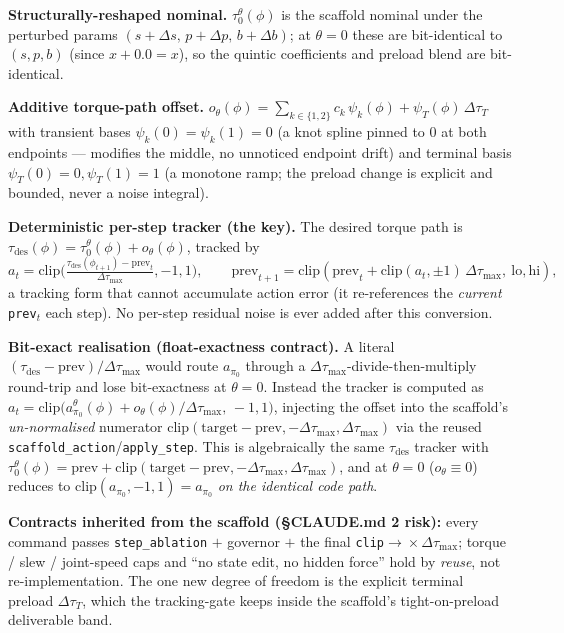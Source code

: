 \documentclass[11pt]{article}
\newcommand{\code}[1]{\texttt{\small #1}}
\newcommand{\slew}{\ensuremath{\Delta\tau_{\max}}}
\begin{document}
\textbf{Structurally-reshaped nominal.} $\tau_0^\theta(\phi)$ is the scaffold nominal under the perturbed params
$(s{+}\Delta s,\,p{+}\Delta p,\,b{+}\Delta b)$; at $\theta{=}0$ these are bit-identical to $(s,p,b)$ (since $x+0.0=x$), so the
quintic coefficients and preload blend are bit-identical.

\textbf{Additive torque-path offset.} $o_\theta(\phi)=\sum_{k\in\{1,2\}} c_k\,\psi_k(\phi)+\psi_T(\phi)\,\Delta\tau_T$ with
transient bases $\psi_k(0){=}\psi_k(1){=}0$ (a knot spline pinned to $0$ at both endpoints --- modifies the middle, no
unnoticed endpoint drift) and terminal basis $\psi_T(0){=}0,\psi_T(1){=}1$ (a monotone ramp; the preload change is explicit
and bounded, never a noise integral).

\textbf{Deterministic per-step tracker (the key).} The desired torque path is
$\tau_{\mathrm{des}}(\phi)=\tau_0^\theta(\phi)+o_\theta(\phi)$, tracked by
\[
a_t=\mathrm{clip}\!\Big(\tfrac{\tau_{\mathrm{des}}(\phi_{t+1})-\text{prev}_t}{\slew},-1,1\Big),\qquad
\text{prev}_{t+1}=\mathrm{clip}(\text{prev}_t+\mathrm{clip}(a_t,\pm1)\,\slew,\ \text{lo},\text{hi}),
\]
a tracking form that cannot accumulate action error (it re-references the \emph{current} \code{prev}$_t$ each step). No
per-step residual noise is ever added after this conversion.

\textbf{Bit-exact realisation (float-exactness contract).} A literal $(\tau_{\mathrm{des}}-\text{prev})/\slew$ would route
$a_{\pi_0}$ through a $\slew$-divide-then-multiply round-trip and lose bit-exactness at $\theta{=}0$. Instead the tracker is
computed as
$a_t=\mathrm{clip}\big(a_{\pi_0}^\theta(\phi)+o_\theta(\phi)/\slew,\,-1,1\big)$, injecting the offset into the scaffold's
\emph{un-normalised} numerator $\mathrm{clip}(\text{target}-\text{prev},-\slew,\slew)$ via the reused
\code{scaffold\_action}/\code{apply\_step}. This is algebraically the same $\tau_{\mathrm{des}}$ tracker with
$\tau_0^\theta(\phi)=\text{prev}+\mathrm{clip}(\text{target}-\text{prev},-\slew,\slew)$, and at $\theta{=}0$ ($o_\theta\!\equiv\!0$)
reduces to $\mathrm{clip}(a_{\pi_0},-1,1)=a_{\pi_0}$ \emph{on the identical code path}.

\textbf{Contracts inherited from the scaffold (\S CLAUDE.md 2 risk):} every command passes \code{step\_ablation} $+$ governor
$+$ the final \code{clip}$\to\!\times\slew$; torque / slew / joint-speed caps and ``no state edit, no hidden force'' hold by
\emph{reuse}, not re-implementation. The one new degree of freedom is the explicit terminal preload $\Delta\tau_T$, which the
tracking-gate keeps inside the scaffold's tight-on-preload deliverable band.
\end{document}
